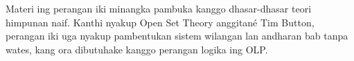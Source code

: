 \documentclass[../../include/open-logic-part]{subfiles}
\begin{document}

\begin{editorial}
  Materi ing perangan iki minangka pambuka kanggo dhasar-dhasar
  teori himpunan naif.
  Kanthi nyakup Open Set Theory anggitané Tim Button, perangan iki
  uga nyakup pambentukan sistem wilangan lan andharan bab tanpa wates,
  kang ora dibutuhake kanggo perangan logika ing OLP.
\end{editorial}







\OLEndPartHook
\end{document}
